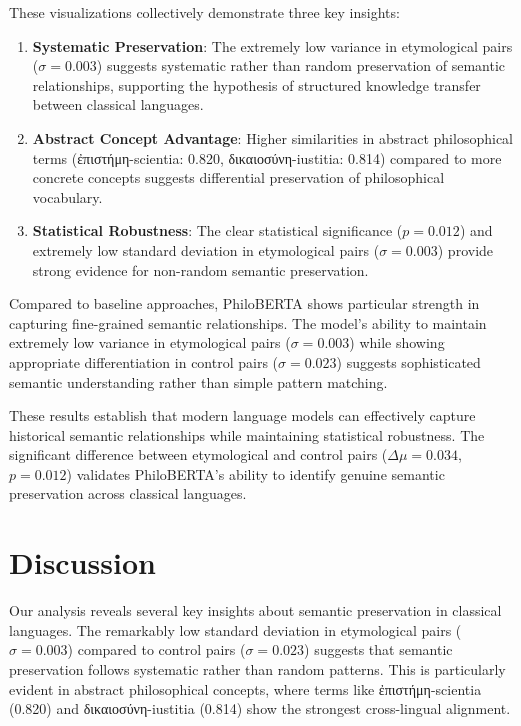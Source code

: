 \documentclass[11pt]{article} %
\begin{document}
These visualizations collectively demonstrate three key insights:

\begin{enumerate}
\item \textbf{Systematic Preservation}: The extremely low variance in etymological pairs ($\sigma = 0.003$) suggests systematic rather than random preservation of semantic relationships, supporting the hypothesis of structured knowledge transfer between classical languages.

\item \textbf{Abstract Concept Advantage}: Higher similarities in abstract philosophical terms (ἐπιστήμη-scientia: 0.820, δικαιοσύνη-iustitia: 0.814) compared to more concrete concepts suggests differential preservation of philosophical vocabulary.

\item \textbf{Statistical Robustness}: The clear statistical significance ($p = 0.012$) and extremely low standard deviation in etymological pairs ($\sigma = 0.003$) provide strong evidence for non-random semantic preservation.
\end{enumerate}

Compared to baseline approaches, PhiloBERTA shows particular strength in capturing fine-grained semantic relationships. The model's ability to maintain extremely low variance in etymological pairs ($\sigma = 0.003$) while showing appropriate differentiation in control pairs ($\sigma = 0.023$) suggests sophisticated semantic understanding rather than simple pattern matching.

These results establish that modern language models can effectively capture historical semantic relationships while maintaining statistical robustness. The significant difference between etymological and control pairs ($\Delta\mu = 0.034$, $p = 0.012$) validates PhiloBERTA's ability to identify genuine semantic preservation across classical languages.

\section{Discussion}
Our analysis reveals several key insights about semantic preservation in classical languages. The remarkably low standard deviation in etymological pairs ($\sigma = 0.003$) compared to control pairs ($\sigma = 0.023$) suggests that semantic preservation follows systematic rather than random patterns. This is particularly evident in abstract philosophical concepts, where terms like \textgreek{ἐπιστήμη}-scientia (0.820) and \textgreek{δικαιοσύνη}-iustitia (0.814) show the strongest cross-lingual alignment.
\end{document}
